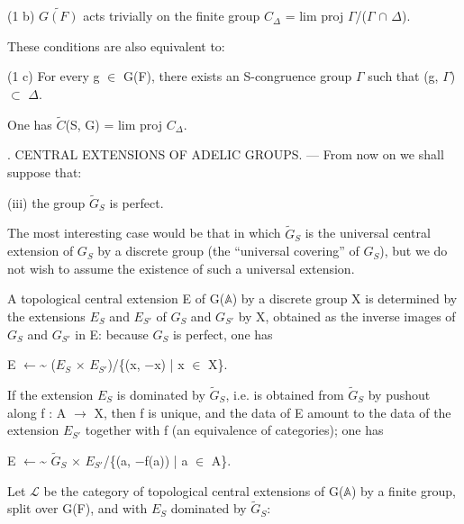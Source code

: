 \documentclass[10pt,a4paper]{article}
\begin{document}
\smallskip
\noindent (1 b) \ensuremath{\widetilde{G(F)}} acts trivially on the finite group \ensuremath{C_Δ} = lim proj \ensuremath{Γ}/(\ensuremath{Γ} \ensuremath{∩} \ensuremath{Δ}).\par
\smallskip
\noindent These conditions are also equivalent to:\par
\smallskip
\noindent (1 c) For every g \ensuremath{∈} G(F), there exists an S-congruence group \ensuremath{Γ} such that (g, \ensuremath{Γ}) \ensuremath{⊂} \ensuremath{Δ}.\par
\smallskip
\noindent One has \ensuremath{\widetilde{C}}(S, G) = lim proj \ensuremath{C_Δ}.\par
\smallskip
{}. CENTRAL EXTENSIONS OF ADELIC GROUPS. — From now on we shall suppose that:\par
\smallskip
\noindent (iii) the group \ensuremath{\widetilde{G}_S} is perfect.\par
\smallskip
\noindent The most interesting case would be that in which \ensuremath{\widetilde{G}_S} is the universal central extension of \ensuremath{G_S} by a discrete group (the “universal covering” of \ensuremath{G_S}), but we do not wish to assume the existence of such a universal extension.\par
\smallskip
\noindent A topological central extension E of G(\ensuremath{𝔸}) by a discrete group X is determined by the extensions \ensuremath{E_S} and \ensuremath{E_{S′}} of \ensuremath{G_S} and \ensuremath{G_{S′}} by X, obtained as the inverse images of \ensuremath{G_S} and \ensuremath{G_{S′}} in E: because \ensuremath{G_S} is perfect, one has\par
\smallskip
\noindent E  \ensuremath{←}\textasciitilde{}  (\ensuremath{E_S} \ensuremath{×} \ensuremath{E_{S′}})/\{(x, \ensuremath{−}x) | x \ensuremath{∈} X\}.\par
\smallskip
\noindent If the extension \ensuremath{E_S} is dominated by \ensuremath{\widetilde{G}_S}, i.e. is obtained from \ensuremath{\widetilde{G}_S} by pushout along f : A \ensuremath{→} X, then f is unique, and the data of E amount to the data of the extension \ensuremath{E_{S′}} together with f (an equivalence of categories); one has\par
\smallskip
\noindent E  \ensuremath{←}\textasciitilde{}  \ensuremath{\widetilde{G}_S} \ensuremath{×} \ensuremath{E_{S′}}/\{(a, \ensuremath{−}f(a)) | a \ensuremath{∈} A\}.\par
\smallskip
\noindent Let \ensuremath{ℒ} be the category of topological central extensions of G(\ensuremath{𝔸}) by a finite group, split over G(F), and with \ensuremath{E_S} dominated by \ensuremath{\widetilde{G}_S}:\par
\end{document}
